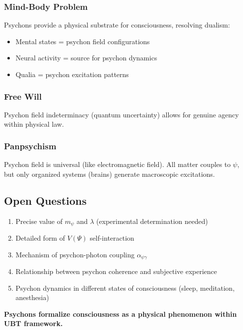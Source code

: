 \subsubsection{Mind-Body Problem}

Psychons provide a physical substrate for consciousness, resolving dualism:
\begin{itemize}
    \item Mental states = psychon field configurations
    \item Neural activity = source for psychon dynamics
    \item Qualia = psychon excitation patterns
\end{itemize}

\subsubsection{Free Will}

Psychon field indeterminacy (quantum uncertainty) allows for genuine agency within physical law.

\subsubsection{Panpsychism}

Psychon field is universal (like electromagnetic field). All matter couples to $\psi$, but only organized systems (brains) generate macroscopic excitations.

\subsection{Open Questions}

\begin{enumerate}
    \item Precise value of $m_\psi$ and $\lambda$ (experimental determination needed)
    \item Detailed form of $V(\Psi)$ self-interaction
    \item Mechanism of psychon-photon coupling $\alpha_{\psi\gamma}$
    \item Relationship between psychon coherence and subjective experience
    \item Psychon dynamics in different states of consciousness (sleep, meditation, anesthesia)
\end{enumerate}

\textbf{Psychons formalize consciousness as a physical phenomenon within UBT framework.}
